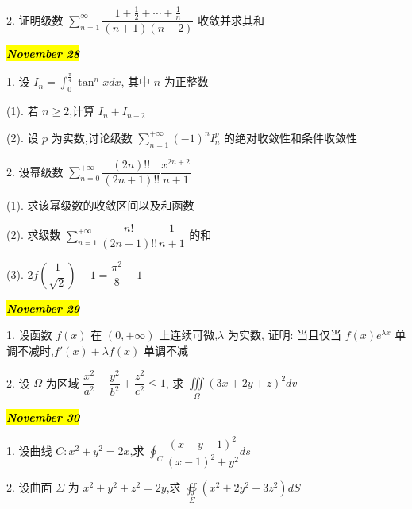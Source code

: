 2. 证明级数 $\sum\limits_{n=1}^{\infty}\dfrac{1+\frac{1}{2}+\cdots+\frac{1}{n}}{(n+1)(n+2)}$ 收敛并求其和
\begin{solution}
	
\end{solution}

\hl{\textbf{\textit{November 28}}}

1. 设 $I_{n}=\int_{0}^{\frac{\pi}{4}}\tan^{n}xdx$, 其中 $n$ 为正整数

(1). 若 $n\geq 2$,计算 $I_{n}+I_{n-2}$

(2). 设 $p$ 为实数,讨论级数 $\sum\limits_{n=1}^{+\infty}(-1)^{n}I_{n}^{p}$ 的绝对收敛性和条件收敛性
\begin{solution}
	
\end{solution}

2. 设幂级数 $\sum\limits_{n=0}^{+\infty}\dfrac{(2n)!!}{(2n+1)!!}\dfrac{x^{2n+2}}{n+1}$

(1). 求该幂级数的收敛区间以及和函数

(2). 求级数 $\sum\limits_{n=1}^{+\infty}\dfrac{n!}{(2n+1)!!}\dfrac{1}{n+1}$ 的和

(3). $2f(\dfrac{1}{\sqrt{2}})-1=\dfrac{\pi^{2}}{8}-1$
\begin{solution}
	
\end{solution}

\hl{\textbf{\textit{November 29}}}

1. 设函数 $f(x)$ 在 $(0,+\infty)$ 上连续可微,$\lambda$ 为实数,
证明: 当且仅当 $f(x)e^{\lambda x}$ 单调不减时,$f'(x)+\lambda f(x)$ 单调不减
\begin{solution}
	
\end{solution}

2. 设 $\Omega$ 为区域 $\dfrac{x^{2}}{a^{2}}+\dfrac{y^{2}}{b^{2}}+\dfrac{z^{2}}{c^{2}}\leq 1$,
求 $\displaystyle{\iiint\limits_{\Omega}(3x+2y+z)^{2}dv}$
\begin{solution}
	
\end{solution}

\hl{\textbf{\textit{November 30}}}

1. 设曲线 $C:x^{2}+y^{2}=2x$,求 $\displaystyle{\oint_{C}\dfrac{(x+y+1)^{2}}{(x-1)^{2}+y^{2}}ds}$
\begin{solution}
	
\end{solution}

2. 设曲面 $\Sigma$ 为 $x^{2}+y^{2}+z^{2}=2y$,求 $\displaystyle{\oiint\limits_{\Sigma}(x^{2}+2y^{2}+3z^{2})dS}$
\begin{solution}
	
\end{solution}
